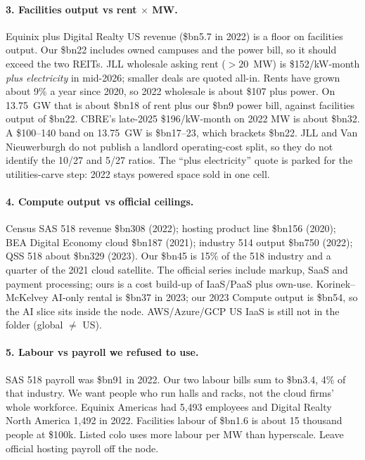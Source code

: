 \documentclass[11pt]{article}
\newcommand{\bn}{\$bn}
\begin{document}
\paragraph{3. Facilities output vs rent $\times$ MW.}
Equinix plus Digital Realty US revenue (\bn5.7 in 2022) is a floor on facilities output. Our \bn22 includes owned campuses and the power bill, so it should exceed the two REITs. JLL wholesale asking rent ($>20$~MW) is \$152/kW-month \emph{plus electricity} in mid-2026; smaller deals are quoted all-in. Rents have grown about 9\% a year since 2020, so 2022 wholesale is about \$107 plus power. On 13.75~GW that is about \bn18 of rent plus our \bn9 power bill, against facilities output of \bn22. CBRE's late-2025 \$196/kW-month on 2022 MW is about \bn32. A \$100--140 band on 13.75~GW is \bn17--23, which brackets \bn22. JLL and Van Nieuwerburgh do not publish a landlord operating-cost split, so they do not identify the 10/27 and 5/27 ratios. The ``plus electricity'' quote is parked for the utilities-carve step: 2022 stays powered space sold in one cell.

\paragraph{4. Compute output vs official ceilings.}
Census SAS 518 revenue \bn308 (2022); hosting product line \bn156 (2020); BEA Digital Economy cloud \bn187 (2021); industry 514 output \bn750 (2022); QSS 518 about \bn329 (2023). Our \bn45 is 15\% of the 518 industry and a quarter of the 2021 cloud satellite. The official series include markup, SaaS and payment processing; ours is a cost build-up of IaaS/PaaS plus own-use. Korinek--McKelvey AI-only rental is \bn37 in 2023; our 2023 Compute output is \bn54, so the AI slice sits inside the node. AWS/Azure/GCP US IaaS is still not in the folder (global $\neq$ US).

\paragraph{5. Labour vs payroll we refused to use.}
SAS 518 payroll was \bn91 in 2022. Our two labour bills sum to \bn3.4, 4\% of that industry. We want people who run halls and racks, not the cloud firms' whole workforce. Equinix Americas had 5,493 employees and Digital Realty North America 1,492 in 2022. Facilities labour of \bn1.6 is about 15 thousand people at \$100k. Listed colo uses more labour per MW than hyperscale. Leave official hosting payroll off the node.
\end{document}
